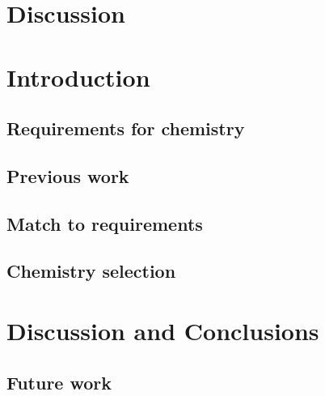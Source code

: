 \documentclass[]{report}
\begin{document}
\chapter{Discussion}

\chapter{Introduction}
\section{Requirements for chemistry}
\section{Previous work}
\section{Match to requirements}
\section{Chemistry selection}

\chapter{Discussion and Conclusions}
\section{Future work}
\end{document}
